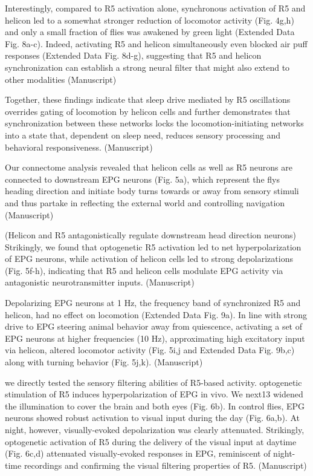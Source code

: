 Interestingly, compared to R5 activation alone, synchronous activation of R5 and helicon led
to a somewhat stronger reduction of locomotor activity (Fig. 4g,h) and only a small fraction of
flies was awakened by green light (Extended Data Fig. 8a-c). Indeed, activating R5 and helicon
simultaneously even blocked air puff responses (Extended Data Fig. 8d-g), suggesting that R5
and helicon synchronization can establish a strong neural filter that might also extend to other
modalities
\cite{raccugliaCoherentMultilevelNetwork2022} (Manuscript)

Together, these findings indicate that sleep drive mediated by R5 oscillations overrides
gating of locomotion by helicon cells and further demonstrates that synchronization between
these networks locks the locomotion-initiating networks into a state that, dependent on sleep
need, reduces sensory processing and behavioral responsiveness.
\cite{raccugliaCoherentMultilevelNetwork2022} (Manuscript)

Our connectome analysis revealed that helicon cells
as well as R5 neurons are connected to downstream EPG neurons (Fig. 5a), which represent
the flys heading direction and initiate body turns towards or away from sensory stimuli and
thus partake in reflecting the external world and controlling navigation
\cite{raccugliaCoherentMultilevelNetwork2022} (Manuscript)

(Helicon and R5 antagonistically regulate downstream head direction neurons) Strikingly, we found that
optogenetic R5 activation led to net hyperpolarization of EPG neurons, while activation of
helicon cells led to strong depolarizations (Fig. 5f-h), indicating that R5 and helicon cells
modulate EPG activity via antagonistic neurotransmitter inputs.
\cite{raccugliaCoherentMultilevelNetwork2022} (Manuscript)

Depolarizing EPG neurons at 1 Hz, the frequency band of synchronized R5 and helicon, had no
effect on locomotion (Extended Data Fig. 9a). In line with strong drive to EPG steering animal
behavior away from quiescence, activating a set of EPG neurons at higher frequencies (10 Hz),
approximating high excitatory input via helicon, altered locomotor activity (Fig. 5i,j and
Extended Data Fig. 9b,c) along with turning behavior (Fig. 5j,k).
\cite{raccugliaCoherentMultilevelNetwork2022} (Manuscript)

we directly tested the sensory filtering abilities of R5-based activity. optogenetic stimulation of
R5 induces hyperpolarization of EPG in vivo. We next13
widened the illumination to cover the brain and both eyes (Fig. 6b). In control flies, EPG
neurons showed robust activation to visual input during the day (Fig. 6a,b). At night, however,
visually-evoked depolarization was clearly attenuated. Strikingly, optogenetic activation of R5
during the delivery of the visual input at daytime (Fig. 6c,d) attenuated visually-evoked
responses in EPG, reminiscent of night-time recordings and confirming the visual filtering
properties of R5.
\cite{raccugliaCoherentMultilevelNetwork2022} (Manuscript)

